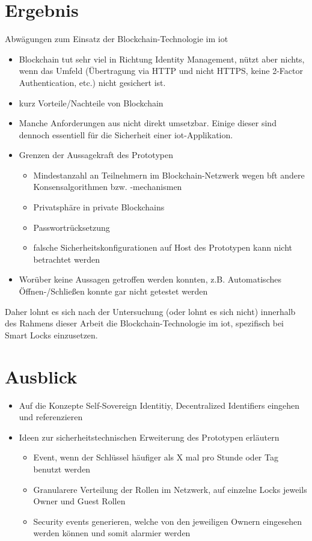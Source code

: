 \section{Ergebnis}
\label{sec:end}
    Abwägungen zum Einsatz der Blockchain-Technologie im \gls{iot}
    \begin{itemize}[noitemsep]
        \item Blockchain tut sehr viel in Richtung Identity Management, nützt aber nichts, wenn das Umfeld (Übertragung via HTTP und nicht HTTPS, keine 2-Factor Authentication, etc.) nicht gesichert ist.
        \item kurz Vorteile/Nachteile von Blockchain
        \item Manche Anforderungen aus  nicht direkt umsetzbar.
            Einige dieser sind dennoch essentiell für die Sicherheit einer \gls{iot}-Applikation.
        \item Grenzen der Aussagekraft des Prototypen
		    \begin{itemize}[noitemsep]
		        \item Mindestanzahl an Teilnehmern im Blockchain-Netzwerk wegen \gls{bft} \textrightarrow andere Konsensalgorithmen bzw. -mechanismen
		        \item Privatsphäre in private Blockchains
		        \item Passwortrücksetzung
		        \item falsche Sicherheitskonfigurationen auf Host des Prototypen kann nicht betrachtet werden
		    \end{itemize}
		\item Worüber keine Aussagen getroffen werden konnten, z.B. Automatisches Öffnen-/\-Schließen konnte gar nicht getestet werden
    \end{itemize}
    Daher lohnt es sich nach der Untersuchung (oder lohnt es sich nicht) innerhalb des Rahmens dieser Arbeit die Blockchain-Technologie im \gls{iot}, spezifisch bei Smart Locks einzusetzen.
    
    
\section{Ausblick}
\label{sec:end_further}
	\begin{itemize}[noitemsep]
		\item Auf die Konzepte Self-Sovereign Identitiy, Decentralized Identifiers eingehen und referenzieren
		\item Ideen zur sicherheitstechnischen Erweiterung des Prototypen erläutern
		\begin{itemize}[noitemsep]
		    \item Event, wenn der Schlüssel häufiger als X mal pro Stunde oder Tag benutzt werden
		    \item Granularere Verteilung der Rollen im Netzwerk, auf einzelne Locks jeweils Owner und Guest Rollen
		    \item Security events generieren, welche von den jeweiligen Ownern eingesehen werden können und somit alarmier werden
		\end{itemize}
	\end{itemize}
